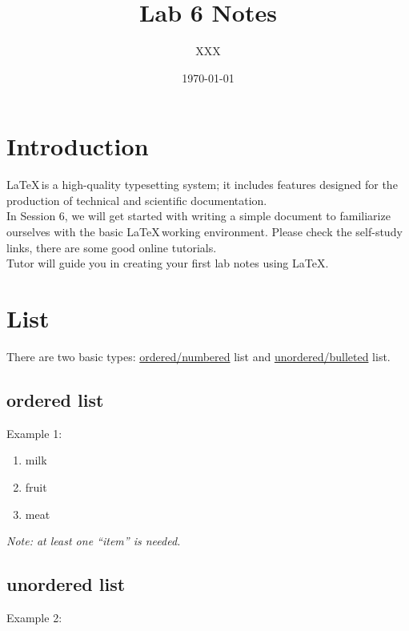 \documentclass{article}
\title{Lab 6 Notes}
\author{XXX}
\date{\today} %
\begin{document}
\maketitle  %

\tableofcontents %

\newpage %



\section{Introduction}


\LaTeX\,is a high-quality typesetting system; it includes features designed for the production of technical and scientific documentation. \\

In Session 6, we will get started with writing a simple document to familiarize ourselves with the basic \LaTeX\,working environment. Please check the self-study links, there are some good online tutorials.\\

Tutor will guide you in creating your first lab notes using \LaTeX.




\section{List}
There are two basic types: \underline{ordered/numbered} list and \underline{unordered/bulleted} list. %
\subsection{ordered list}
Example 1:

\begin{enumerate}
\item milk
\item fruit
\item meat
\end{enumerate}
\textit{Note: at least one ``item'' is needed.} %

\subsection{unordered list}
Example 2:
\end{document}
